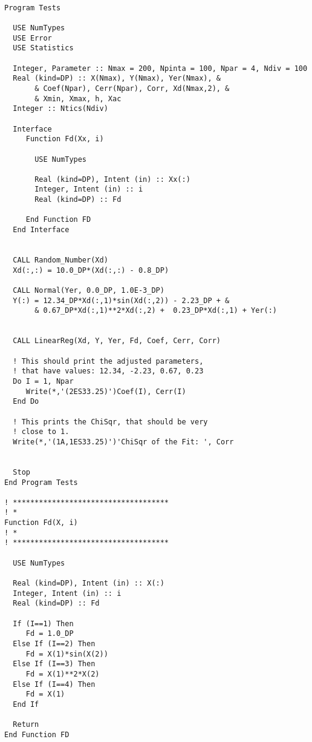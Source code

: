 \begin{verbatim}

Program Tests

  USE NumTypes
  USE Error
  USE Statistics

  Integer, Parameter :: Nmax = 200, Npinta = 100, Npar = 4, Ndiv = 100
  Real (kind=DP) :: X(Nmax), Y(Nmax), Yer(Nmax), &
       & Coef(Npar), Cerr(Npar), Corr, Xd(Nmax,2), &
       & Xmin, Xmax, h, Xac
  Integer :: Ntics(Ndiv)

  Interface
     Function Fd(Xx, i)
       
       USE NumTypes
       
       Real (kind=DP), Intent (in) :: Xx(:)
       Integer, Intent (in) :: i
       Real (kind=DP) :: Fd
       
     End Function FD
  End Interface


  CALL Random_Number(Xd)
  Xd(:,:) = 10.0_DP*(Xd(:,:) - 0.8_DP)

  CALL Normal(Yer, 0.0_DP, 1.0E-3_DP)
  Y(:) = 12.34_DP*Xd(:,1)*sin(Xd(:,2)) - 2.23_DP + &
       & 0.67_DP*Xd(:,1)**2*Xd(:,2) +  0.23_DP*Xd(:,1) + Yer(:) 


  CALL LinearReg(Xd, Y, Yer, Fd, Coef, Cerr, Corr)
  
  ! This should print the adjusted parameters, 
  ! that have values: 12.34, -2.23, 0.67, 0.23
  Do I = 1, Npar
     Write(*,'(2ES33.25)')Coef(I), Cerr(I)
  End Do

  ! This prints the ChiSqr, that should be very 
  ! close to 1.
  Write(*,'(1A,1ES33.25)')'ChiSqr of the Fit: ', Corr


  Stop
End Program Tests

! ************************************
! *
Function Fd(X, i)
! *
! ************************************

  USE NumTypes

  Real (kind=DP), Intent (in) :: X(:)
  Integer, Intent (in) :: i
  Real (kind=DP) :: Fd

  If (I==1) Then
     Fd = 1.0_DP
  Else If (I==2) Then
     Fd = X(1)*sin(X(2))
  Else If (I==3) Then
     Fd = X(1)**2*X(2)
  Else If (I==4) Then
     Fd = X(1)
  End If

  Return
End Function FD
\end{verbatim}

